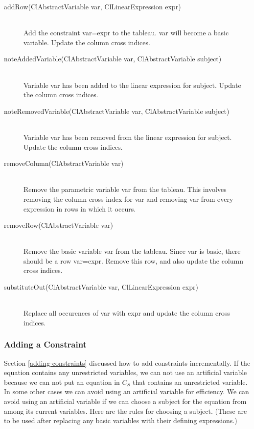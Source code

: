 \documentclass{article}
\begin{document}
\begin{description}
  

\item[{\sf addRow(ClAbstractVariable var, ClLinearExpression expr)}]  \ \\
      Add the constraint {\sf var=expr} to the tableau.  {\sf var} will
      become a basic variable.  Update the column cross indices.
      

\item[{\sf noteAddedVariable(ClAbstractVariable var, ClAbstractVariable subject)}]  \ \\
      Variable {\sf var} has been added to the linear expression for
      {\sf subject}.  Update the column cross indices.
      

\item[{\sf noteRemovedVariable(ClAbstractVariable var, ClAbstractVariable subject)}]  \ \\
      Variable {\sf var} has been removed from the linear expression for
      {\sf subject}.  Update the column cross indices.
      

\item[{\sf removeColumn(ClAbstractVariable var)}] \ \\
      Remove the parametric variable {\sf var} from the tableau.  This
      involves removing the column cross index for {\sf var} and
      removing {\sf var} from every expression in {\sf rows} in which it
      occurs.
      

\item[{\sf removeRow(ClAbstractVariable var)}] \ \\
      Remove the basic variable {\sf var} from the tableau.  Since {\sf
        var} is basic, there should be a row {\sf var=expr}.  Remove
      this row, and also update the column cross indices.
      

\item[{\sf substituteOut(ClAbstractVariable var, ClLinearExpression expr)}] \ \\
      Replace all occurences of {\sf var} with {\sf expr} and update the
      column cross indices.

\end{description}

\subsubsection{Adding a Constraint}
\label{cassowary-adding-constraints}

Section \ref{adding-constraints} discussed how to add constraints
incrementally.  If the equation contains any unrestricted variables, we can
not use an artificial variable because we can not put an equation in $C_S$
that contains an unrestricted variable.  In some other cases we can avoid
using an artificial variable for efficiency.  We can avoid using an
artificial variable if we can choose a subject for the equation from among
its current variables.  Here are the rules for choosing a subject.  (These
are to be used after replacing any basic variables with their defining
expressions.)
\end{document}
